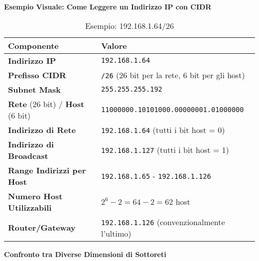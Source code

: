 \textbf{Esempio Visuale: Come Leggere un Indirizzo IP con CIDR}


\begin{table}[h]
\centering
\begin{tabular}{|l|l|}
\hline
\rowcolor{bg_custom}
\textcolor{primarytext}{\textbf{Componente}} & \textcolor{primarytext}{\textbf{Valore}} \\
\hline
\textbf{Indirizzo IP} & \texttt{192.168.1.64} \\
\hline
\textbf{Prefisso CIDR} & \texttt{/26} (26 bit per la rete, 6 bit per gli host) \\
\hline
\textbf{Subnet Mask} & \texttt{255.255.255.192} \\
\hline
\textcolor{retecolor}{\textbf{Rete} (26 bit)} / \textcolor{hostcolor}{\textbf{Host} (6 bit)} & \textcolor{retecolor}{\texttt{11000000.10101000.00000001.01}}\textcolor{hostcolor}{\texttt{000000}} \\
\hline
\textbf{Indirizzo di Rete} & \texttt{192.168.1.64} (tutti i bit host = 0) \\
\hline
\textbf{Indirizzo di Broadcast} & \texttt{192.168.1.127} (tutti i bit host = 1) \\
\hline
\textbf{Range Indirizzi per Host} & \texttt{192.168.1.65} - \texttt{192.168.1.126} \\
\hline
\textbf{Numero Host Utilizzabili} & $2^6 - 2 = 64 - 2 = 62$ host \\
\hline
\textbf{Router/Gateway} & \texttt{192.168.1.126} (convenzionalmente l'ultimo) \\
\hline
\end{tabular}
\caption{Esempio: 192.168.1.64/26}
\end{table}

\vspace{1em}

\textbf{Confronto tra Diverse Dimensioni di Sottoreti}

